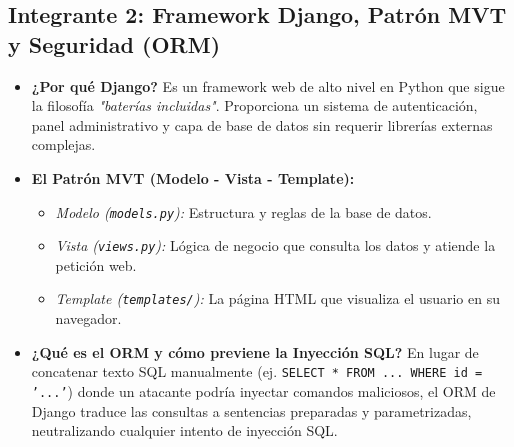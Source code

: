 \documentclass[11pt,a4paper]{article}
\begin{document}
\subsection{Integrante 2: Framework Django, Patrón MVT y Seguridad (ORM)}
\begin{itemize}
    \item \textbf{¿Por qué Django?} Es un framework web de alto nivel en Python que sigue la filosofía \textit{"baterías incluidas"}. Proporciona un sistema de autenticación, panel administrativo y capa de base de datos sin requerir librerías externas complejas.
    \item \textbf{El Patrón MVT (Modelo - Vista - Template):}
    \begin{itemize}
        \item \textit{Modelo (\texttt{models.py}):} Estructura y reglas de la base de datos.
        \item \textit{Vista (\texttt{views.py}):} Lógica de negocio que consulta los datos y atiende la petición web.
        \item \textit{Template (\texttt{templates/}):} La página HTML que visualiza el usuario en su navegador.
    \end{itemize}
    \item \textbf{¿Qué es el ORM y cómo previene la Inyección SQL?} En lugar de concatenar texto SQL manualmente (ej. \texttt{SELECT * FROM ... WHERE id = '...'}) donde un atacante podría inyectar comandos maliciosos, el ORM de Django traduce las consultas a sentencias preparadas y parametrizadas, neutralizando cualquier intento de inyección SQL.
\end{itemize}
\end{document}
